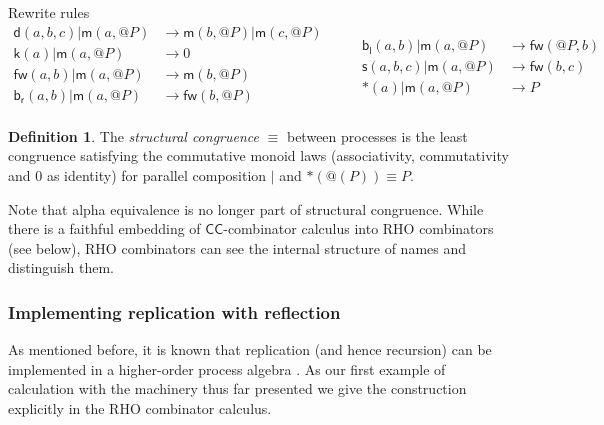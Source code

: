 \documentclass[submission,copyright,creativecommons]{eptcs}
\makeatletter
\newcommand{\ccomb}{$\mathsf{CC}$-combinator calculus}
\newcommand{\pzero}{\mathbin{0}}
\newcommand{\scong}{\mathbin{\equiv}}
\newcommand{\quotep}[1]{\mathsf{@}#1}
\newcommand{\red}{\rightarrow}
\theoremstyle{definition}
\newtheorem{definition}{Definition}
\theoremstyle{remark}
\theoremstyle{remark}
\makeatother
\begin{document}
Rewrite rules
\[\begin{array}{rl}
\mathsf{d}(a,b,c) | \mathsf{m}(a,\quotep{P}) & \red \mathsf{m}(b,\quotep{P}) | \mathsf{m}(c,\quotep{P}) \\
\mathsf{k}(a) | \mathsf{m}(a,\quotep{P}) & \red 0 \\
\mathsf{fw}(a,b) | \mathsf{m}(a,\quotep{P}) & \red \mathsf{m}(b,\quotep{P}) \\
\mathsf{b}_{\mathsf{r}}(a,b) | \mathsf{m}(a,\quotep{P}) & \red \mathsf{fw}(b,\quotep{P}) \\  
\end{array} \quad \quad
\begin{array}{rl}
  \mathsf{b}_{\mathsf{l}}(a,b) | \mathsf{m}(a,\quotep{P}) & \red \mathsf{fw}(\quotep{P},b) \\
  \mathsf{s}(a,b,c) | \mathsf{m}(a,\quotep{P}) & \red \mathsf{fw}(b,c) \\
  *(a) | \mathsf{m}(a,\quotep{P}) & \red P
\end{array}\]

\begin{definition}
  The {\em structural congruence} $\equiv$
  between processes \cite{SangiorgiWalker} is the least congruence
  satisfying the commutative monoid laws
  (associativity, commutativity and $\pzero$ as identity) for parallel
  composition $|$ and $*(@(P)) \equiv P$.
\end{definition}

Note that alpha equivalence is no longer part of structural
congruence.  While there is a faithful embedding of {\ccomb} into RHO combinators (see below), RHO combinators can see
the internal structure of names and distinguish them.

\subsubsection{Implementing replication with reflection}

% 
% 
% 
% 
% 
As mentioned before, it is known that replication (and hence
recursion) can be implemented in a higher-order process algebra
\cite{SangiorgiWalker}. As our first example of calculation with the
machinery thus far presented we give the construction explicitly in
the RHO combinator calculus.
\end{document}
